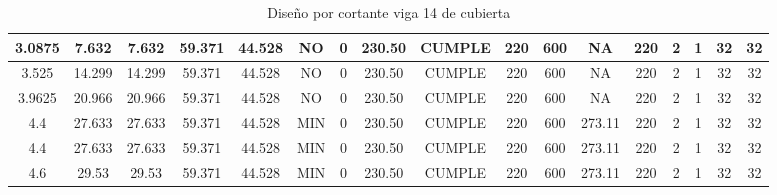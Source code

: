 \begin{table}[H]
{\begin{tabular}{|c|c|c|c|c|c|c|c|c|c|c|c|c|c|c|c|c|}
    \hline
    3.0875 & 7.632 & 7.632 & 59.371 & 44.528 & NO    & 0     & 230.50 & CUMPLE & 220   & 600   & NA    & 220   & 2     & 1     & 32    & 32 \bigstrut\\
    \hline
    3.525 & 14.299 & 14.299 & 59.371 & 44.528 & NO    & 0     & 230.50 & CUMPLE & 220   & 600   & NA    & 220   & 2     & 1     & 32    & 32 \bigstrut\\
    \hline
    3.9625 & 20.966 & 20.966 & 59.371 & 44.528 & NO    & 0     & 230.50 & CUMPLE & 220   & 600   & NA    & 220   & 2     & 1     & 32    & 32 \bigstrut\\
    \hline
    4.4   & 27.633 & 27.633 & 59.371 & 44.528 & MIN   & 0     & 230.50 & CUMPLE & 220   & 600   & 273.11 & 220   & 2     & 1     & 32    & 32 \bigstrut\\
    \hline
    4.4   & 27.633 & 27.633 & 59.371 & 44.528 & MIN   & 0     & 230.50 & CUMPLE & 220   & 600   & 273.11 & 220   & 2     & 1     & 32    & 32 \bigstrut\\
    \hline
    4.6   & 29.53 & 29.53 & 59.371 & 44.528 & MIN   & 0     & 230.50 & CUMPLE & 220   & 600   & 273.11 & 220   & 2     & 1     & 32    & 32 \bigstrut\\
    \hline
    \end{tabular}}%
  \caption{Diseño por cortante viga 14 de cubierta}
  \label{tab:Cort V14C}%
\end{table}%
